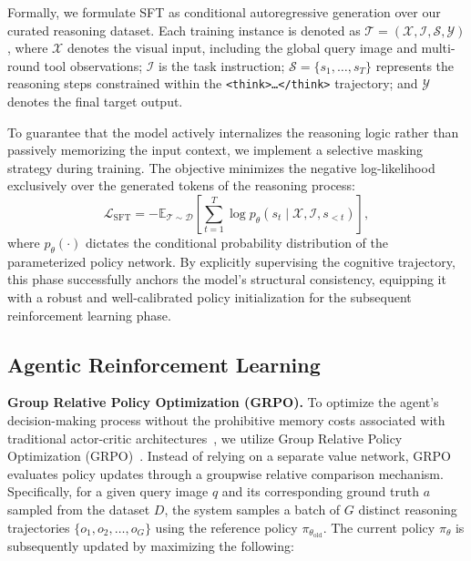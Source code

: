 \documentclass{article}
\begin{document}
Formally, we formulate SFT as conditional autoregressive generation over our curated reasoning dataset. Each training instance is denoted as $\mathcal{T} = (\mathcal{X}, \mathcal{I}, \mathcal{S}, \mathcal{Y})$, where $\mathcal{X}$ denotes the visual input, including the global query image and multi-round tool observations; $\mathcal{I}$ is the task instruction; $\mathcal{S}=\{s_1,\dots,s_T\}$ represents the reasoning steps constrained within the \texttt{<think>\dots</think>} trajectory; and $\mathcal{Y}$ denotes the final target output.

To guarantee that the model actively internalizes the reasoning logic rather than passively memorizing the input context, we implement a selective masking strategy during training. The objective minimizes the negative log-likelihood exclusively over the generated tokens of the reasoning process:
\begin{equation}
\mathcal{L}_{\text{SFT}} = -\mathbb{E}_{\mathcal{T} \sim \mathcal{D}} \left[ \sum_{t=1}^{T} \log p_{\theta}(s_t \mid \mathcal{X}, \mathcal{I}, s_{<t}) \right],
\end{equation}
where $p_{\theta}(\cdot)$ dictates the conditional probability distribution of the parameterized policy network. By explicitly supervising the cognitive trajectory, this phase successfully anchors the model's structural consistency, equipping it with a robust and well-calibrated policy initialization for the subsequent reinforcement learning phase.

\subsection{Agentic Reinforcement Learning}
\label{sec:RL}

\textbf{Group Relative Policy Optimization (GRPO).}
To optimize the agent's decision-making process without the prohibitive memory costs associated with traditional actor-critic architectures~\citep{schulman2017proximal}, we utilize Group Relative Policy Optimization (GRPO)~\citep{shao2024deepseekmath}. Instead of relying on a separate value network, GRPO evaluates policy updates through a groupwise relative comparison mechanism.
Specifically, for a given query image $ q $ and its corresponding ground truth $ a $ sampled from the dataset $ D $, the system samples a batch of $ G $ distinct reasoning trajectories $ \{o_1, o_2, \dots, o_G\} $ using the reference policy $ \pi_{\theta_{\text{old}}} $. The current policy $ \pi_\theta $ is subsequently updated by maximizing the following:  
\end{document}
